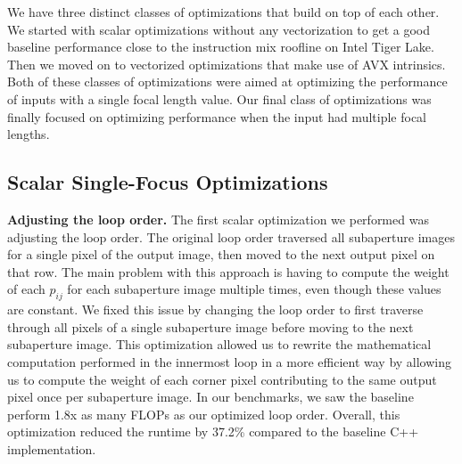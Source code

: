 \documentclass[letterpaper]{article}
\newcommand{\mypar}[1]{{\bf #1.}}
\begin{document}






We have three distinct classes of optimizations that build on top of each other. We started with scalar optimizations without any vectorization to get a good baseline performance close to the instruction mix roofline on Intel Tiger Lake. Then we moved on to vectorized optimizations that make use of AVX intrinsics. Both of these classes of optimizations were aimed at optimizing the performance of inputs with a single focal length value. Our final class of optimizations was finally focused on optimizing performance when the input had multiple focal lengths.

\subsection{Scalar Single-Focus Optimizations}
\mypar{Adjusting the loop order} The first scalar optimization we performed was adjusting the loop order. 
The original loop order traversed all subaperture images for a single pixel of the output image, then moved to the next output pixel on that row. The main problem with this approach is having to compute the weight of each $p_{ij}$ for each subaperture image multiple times, even though these values are constant. We fixed this issue by changing the loop order to first traverse through all pixels of a single subaperture image before moving to the next subaperture image. This optimization allowed us to rewrite the mathematical computation performed in the innermost loop in a more efficient way by allowing us to compute the weight of each corner pixel contributing to the same output pixel once per subaperture image. In our benchmarks, we saw the baseline perform 1.8x as many FLOPs as our optimized loop order. Overall, this optimization reduced the runtime by 37.2\% compared to the baseline C++ implementation.

\end{document}
